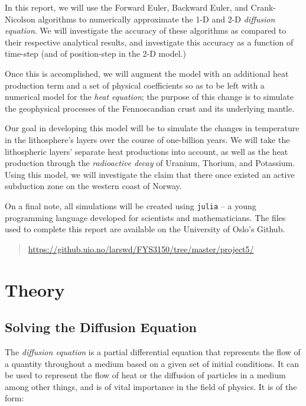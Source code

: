 \documentclass[a4paper,10pt,english]{article}
\begin{document}
In this report, we will use the Forward Euler, Backward Euler, and Crank-Nicolson algorithms to numerically approximate the 1-D and 2-D \textit{diffusion equation}. We will investigate the accuracy of these algorithms as compared to their respective analytical results, and investigate this accuracy as a function of time-step (and of position-step in the 2-D model.)  

Once this is accomplished, we will augment the model with an additional heat production term and a set of physical coefficients so as to be left with a numerical model for the \textit{heat equation}; the purpose of this change is to simulate the geophysical processes of the Fennoscandian crust and its underlying mantle.  

Our goal in developing this model will be to simulate the changes in temperature in the lithosphere's layers over the course of one-billion years. We will take the lithospheric layers' separate heat productions into account, as well as the heat production through the \textit{radioactive decay} of Uranium, Thorium, and Potassium.  Using this model, we will investigate the claim that there once existed an active subduction zone on the western coast of Norway.

On a final note, all simulations will be created using \texttt{julia} – a young programming language developed for scientists and mathematicians.  The files used to complete this report are available on the University of Oslo's Github.

\begin{quote}
\url{https://github.uio.no/larswd/FYS3150/tree/master/project5/}
\end{quote}

\section*{Theory}

\subsection*{Solving the Diffusion Equation}

The \textit{diffusion equation} is a partial differential equation that represents the flow of a quantity throughout a medium based on a given set of initial conditions.  It can be used to represent the flow of heat or the diffusion of particles in a medium among other things, and is of vital importance in the field of physics.  It is of the form:
\end{document}
